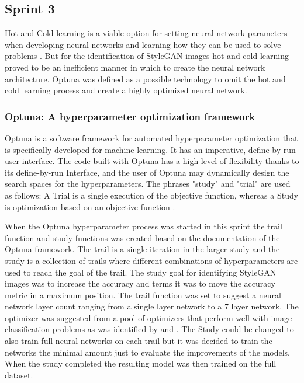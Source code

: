 \subsection{Sprint 3}

Hot and Cold learning is a viable option for setting neural network parameters when developing neural networks and learning how they can be used to solve problems \citep{Trask2019}. But for the identification of StyleGAN images hot and cold learning proved to be an inefficient manner in which to create the neural network architecture. Optuna was defined as a possible technology to omit the hot and cold learning process and create a highly optimized neural network.  

\subsubsection{Optuna: A hyperparameter optimization framework}

Optuna is a software framework for automated hyperparameter optimization that is specifically developed for machine learning. It has an imperative, define-by-run user interface. The code built with Optuna has a high level of flexibility thanks to its define-by-run Interface, and the user of Optuna may dynamically design the search spaces for the hyperparameters. The phrases "study" and "trial" are used as follows: A Trial is a single execution of the objective function, whereas a Study is optimization based on an objective function \citep{optuna2019}.

When the Optuna hyperparameter process was started in this sprint the trail function and study functions was created based on the documentation of the Optuna framework. The trail is a single iteration in the larger study and the study is a collection of trails where different combinations of hyperparameters are used to reach the goal of the trail. The study goal for identifying StyleGAN images was to increase the accuracy and \cite{optuna2019} terms it was to move the accuracy metric in a maximum position. The trail function was set to suggest a neural network layer count ranging from a single layer network to a 7 layer network. The optimizer was suggested from a pool of optimizers that perform well with image classification problems as was identified by \cite{bera2020analysis} and \cite{kandel2020comparative}. The Study could be changed to also train full neural networks on each trail but it was decided to train the networks the minimal amount just to evaluate the improvements of the models. When the study completed the resulting model was then trained on the full dataset.

